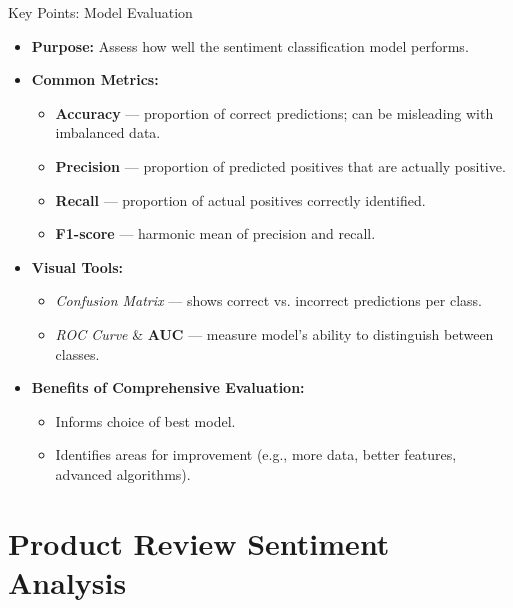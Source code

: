 \documentclass[aspectratio=169, table]{beamer}
\begin{document}
\begin{frame}{Key Points: Model Evaluation}
	\vspace{20pt}
	\begin{itemize}
		\item \textbf{Purpose:} Assess how well the sentiment classification model performs.
		\item \textbf{Common Metrics:}
		\begin{itemize}
			\item \textbf{Accuracy} — proportion of correct predictions; can be misleading with imbalanced data.
			\item \textbf{Precision} — proportion of predicted positives that are actually positive.
			\item \textbf{Recall} — proportion of actual positives correctly identified.
			\item \textbf{F1-score} — harmonic mean of precision and recall.
		\end{itemize}
		\item \textbf{Visual Tools:}
		\begin{itemize}
			\item \textit{Confusion Matrix} — shows correct vs. incorrect predictions per class.
			\item \textit{ROC Curve} \& \textbf{AUC} — measure model’s ability to distinguish between classes.
		\end{itemize}
		\item \textbf{Benefits of Comprehensive Evaluation:}
		\begin{itemize}
			\item Informs choice of best model.
			\item Identifies areas for improvement (e.g., more data, better features, advanced algorithms).
		\end{itemize}
	\end{itemize}
\end{frame}

\section{Product Review Sentiment Analysis}
\end{document}
